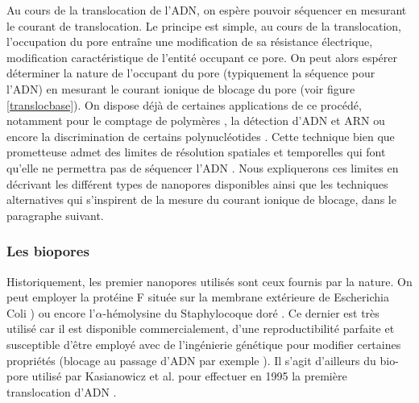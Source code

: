 Au cours de la translocation de l'ADN, on espère pouvoir séquencer en mesurant le courant de translocation. Le principe est simple, au cours de la translocation, l'occupation du pore entraîne une modification de sa résistance électrique, modification caractéristique de l'entité occupant ce pore. On peut alors espérer déterminer la nature de l'occupant du pore (typiquement la séquence pour l'ADN) en mesurant le courant ionique de blocage du pore (voir figure \ref{translocbase}). On dispose déjà de certaines applications de ce procédé, notamment pour le comptage de polymères \cite{Bezrukov1994}, la détection d'ADN et ARN \cite{Kasianowicz1996} ou encore la discrimination de certains polynucléotides \cite{Akeson1999,Meller2000,Ashkenasy2005}. Cette technique bien que prometteuse admet des limites de résolution spatiales et temporelles qui font qu'elle ne permettra pas de séquencer l'ADN \cite{Branton2008}. Nous expliquerons ces limites en décrivant les différent types de nanopores disponibles ainsi que les techniques alternatives qui s'inspirent de la mesure du courant ionique de blocage, dans le paragraphe suivant.


\subsubsection{Les biopores}


Historiquement, les premier nanopores utilisés sont ceux fournis par la nature. On peut employer la protéine F située sur la membrane extérieure de Escherichia Coli \cite{Danelon2006,Chimerel2008}) ou encore l'$\alpha$-hémolysine du Staphylocoque doré \cite{Bhakdi01121991}. Ce dernier est très utilisé car il est disponible commercialement, d'une reproductibilité parfaite et susceptible d'être employé avec de l'ingénierie génétique pour modifier certaines propriétés (blocage au passage d'ADN par exemple \cite{Howorka2001}). Il s'agit d'ailleurs du bio-pore utilisé par Kasianowicz et al. pour effectuer en 1995 la première translocation d'ADN \cite{Kasianowicz1996}.


